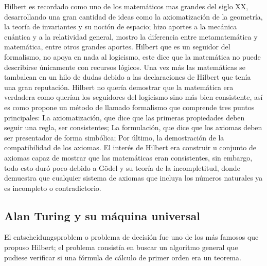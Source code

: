 \documentclass[11pt]{article}
\begin{document}
Hilbert es recordado como uno de los matemáticos mas grandes del siglo XX, desarrollando una gran cantidad de ideas como la axiomatización de la geometría, la teoría de invariantes y su noción de espacio; hizo aportes a la mecánica cuántica y a la relatividad general, mostro la diferencia entre metamatemática y matemática, entre otros grandes aportes. Hilbert que es un seguidor del formalismo, no apoya en nada al logicismo, este dice que la matemática no puede describirse únicamente con recursos lógicos. Una vez más las matemáticas se tambalean en un hilo de dudas debido a las declaraciones de Hilbert que tenía una gran reputación. Hilbert no quería demostrar que la matemática era verdadera como querían los seguidores del logicismo sino más bien consistente, así es como propone un método de llamado formalismo que comprende tres puntos principales: La axiomatización, que dice que las primeras propiedades deben seguir una regla, ser consistentes; La formulación, que dice que los axiomas deben ser presentador de forma simbólica; Por último, la demostración de la compatibilidad de los axiomas. El interés de Hilbert era construir u conjunto de axiomas capaz de mostrar que las matemáticas eran consistentes, sin embargo, todo esto duró poco debido a Gödel y su teoría de la incompletitud, donde demuestra que cualquier sistema de axiomas que incluya los números naturales ya es incompleto o contradictorio.

\citet{hilbert}
\citet{incompletitud}

\subsection{Alan Turing y su máquina universal}

El entscheidungsproblem o problema de decisión fue uno de los más famosos que propuso Hilbert; el problema consistía en buscar un algoritmo general que pudiese verificar si una fórmula de cálculo de primer orden era un teorema.

\citet{Wiki2}
\end{document}
